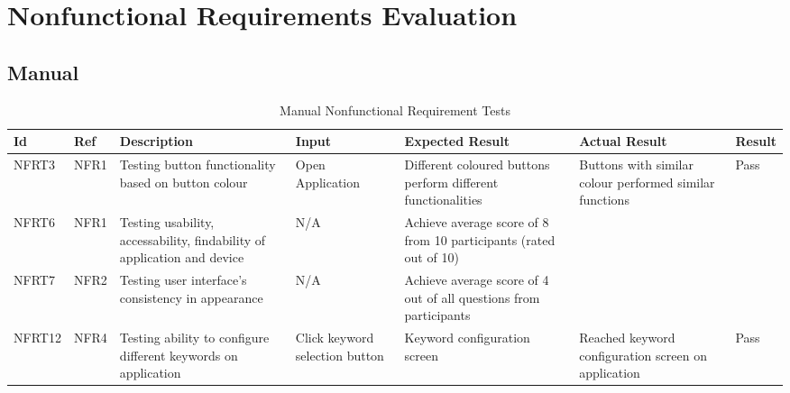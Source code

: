 \documentclass[12pt, titlepage]{article}
\begin{document}
\section{Nonfunctional Requirements Evaluation}

\subsection{Manual}
\begin{longtable}{|p{1.4cm}|p{1cm}|p{3cm}|p{1.5cm}|p{2.5cm}|p{2cm}|p{1.2cm}|}
  \caption{Manual Nonfunctional Requirement Tests}
  \label{manualNonfunctionalRequirementTests}
  \endfirsthead
  \endhead
  \hline
  \textbf{Id} & \textbf{Ref} & \textbf{Description}                                                         & \textbf{Input}                                    & \textbf{Expected Result}                                    & \textbf{Actual Result} & \textbf{Result}                                    \\ \hline
  NFRT3        & NFR1          & Testing button functionality based on button colour                     & Open Application                 & Different coloured buttons perform different functionalities    & Buttons with similar colour performed similar functions                        & {\color[HTML]{32CB00} Pass}                        \\ \hline
  NFRT6        & NFR1          & Testing usability, accessability, findability of application and device                     & N/A                              & Achieve average score of 8 from 10 participants (rated out of 10)                           &                       &  \cellcolor[HTML]{FFFFFF}{\color[HTML]{F8A102} TBD}                       \\ \hline
  NFRT7        & NFR2          & Testing user interface's consistency in appearance                     & N/A                              & Achieve average score of 4 out of all questions from participants                       &                        & \cellcolor[HTML]{FFFFFF}{\color[HTML]{F8A102} TBD} \\ \hline
  NFRT12        & NFR4         & Testing ability to configure different keywords on application                    & Click keyword selection button   & Keyword configuration screen                                                   & Reached keyword configuration screen on application                     & {\color[HTML]{32CB00} Pass}                                                    \\ \hline

\end{longtable}
\end{document}

